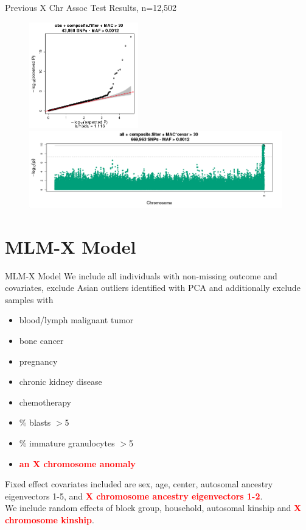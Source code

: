 \documentclass{beamer}
\begin{document}
\begin{frame}{Previous X Chr Assoc Test Results, n=12,502}
\centering
\begin{figure}
\includegraphics[height=4.6cm]{pval_qq_filtered_2015-02-27_11-37-52_auto_316987_v2.png}\\
\includegraphics[width=11cm]{pval_manh_single_2015-02-27_11-37-52_auto_316987_v2.png}
\end{figure}
\end{frame}

\section{MLM-X Model}
\begin{frame}{MLM-X Model}
We include all individuals with non-missing outcome and covariates, exclude Asian outliers identified with PCA and additionally exclude samples with
\begin{itemize}
\item blood/lymph malignant tumor
\item bone cancer
\item pregnancy
\item chronic kidney disease
\item chemotherapy
\item \% blasts $>$5
\item \% immature granulocytes $>$5
\item \textbf{\textcolor{red}{an X chromosome anomaly}}
\end{itemize}
Fixed effect covariates included are sex, age, center, autosomal ancestry eigenvectors 1-5, and \textbf{\textcolor{red}{X chromosome ancestry eigenvectors 1-2}}.\\
We include random effects of block group, household, autosomal kinship and \textbf{\textcolor{red}{X chromosome kinship}}.
\end{frame}
\end{document}
